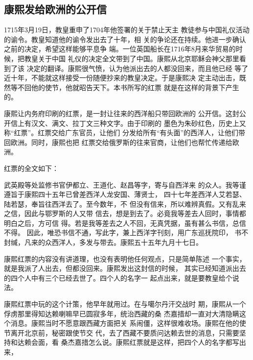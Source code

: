 \subsection{康熙发给欧洲的公开信}
\par
1715年3月19日，教皇重申了1704年他签署的关于禁止天主%
教徒参与中国礼仪活动的谕令。教皇知道他的谕令发出去了十年，相%
关的争论还在持续。他进一步确认之前的决定，希望这样能够平息争%
端。一位英国船长在1716年8月来华贸易的时候，把教皇关于中国%
礼仪的决定全文带到了中国。康熙从北京耶稣会神父那里看到了该%
决定的翻译。康熙很气愤，认为他派出去的人都没回来，而且他已经%
等了近十年，不能就这样接受一份随便抄来的教皇决定。于是康熙决%
定主动出击，既然等不回他的使节，他就昭告天下。本书所写的红票%
就是在这样的背景下产生的。%
\par
康熙让内务府印刷的红票，是一封让往来的西洋船只带回欧洲的%
公开信。这封公开信上有汉文、满文、拉丁文三种文字。由于印刷的%
墨色为朱砂红色，历史上又称“红票”。红票交给广东官员，让他们%
分发给所有“有头面”的西洋人，让他们带回欧洲。同时，康熙也把%
红票交给俄罗斯的往来官商，让他们也帮忙传递给欧洲。%
\par
红票的全文如下：%
\par
{\bookkai 武英殿等处监修书官伊都立、王道化、赵昌等字，寄与自西洋来}%
{\bookkai 的众人。我等谨遵旨于康熙四十五年已曾差西洋人龙安国、薄贤士，}%
{\bookkai 四十七年差西洋人艾若瑟、陆若瑟，奉旨往西洋去了。至今数年，不}%
{\bookkai 但没有信来，所以难辨真假。又有乱来之信，因此与鄂罗斯的人又带}%
{\bookkai 信去，想是到去了。必竟我等差去人回时，事情都明白之后，方可信}%
{\bookkai 得。若是我等差去之人不回，无真凭据，虽有甚么书信，总信不得。}%
{\bookkai 因此，唯恐书信不通，写此字，兼上西洋字刊刻，用广东巡抚院印，}%
{\bookkai 书不封缄，凡来的众西洋人，多发与带去。康熙五十五年九月十七日。}%
\par
康熙红票的内容没有讲道理，也没有表明他任何观点，只是简单陈述%
一个事实，就是我派了人出去，但都没回来。康熙发出这封信的时候，%
其实已经知道派出去的四个人中有三个已经去世了。四个人的名字一%
起点出来，就是要教皇给个说法。%
\par
康熙红票中玩的这个计策，他早年就用过。在与噶尔丹汗交战时%
期，康熙从一个俘虏那里得知达赖喇嘛早已圆寂多年，统治西藏的桑%
杰嘉措却一直对大清隐瞒这个消息。康熙当时不愿意跟西藏方面把关%
系闹僵，这样很难收场。康熙在他的使节离开北京前，秘密跟使节交%
代，去了西藏不要质问达赖去世的消息，只需要坚持和达赖会面，看%
桑杰嘉措怎么说。康熙红票就是这样，把四个人的名字都写出来，%
